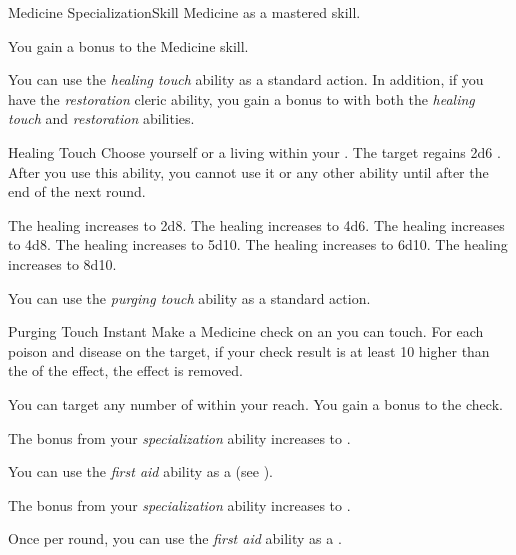     \begin{feat}{Medicine Specialization}{Skill}
        \featpre Medicine as a mastered skill.

         You gain a  bonus to the Medicine skill.

         You can use the \textit{healing touch} ability as a standard action.
        In addition, if you have the \textit{restoration} cleric ability, you gain a  bonus to  with both the \textit{healing touch} and \textit{restoration} abilities.
        \begin{instantability}{Healing Touch}
            \rankline
            Choose yourself or a living  within your .
            The target regains 2d6 \add {} .
            After you use this ability, you cannot use it or any other  ability until after the end of the next round.

            \rankline
             The healing increases to 2d8.
             The healing increases to 4d6.
             The healing increases to 4d8.
             The healing increases to 5d10.
             The healing increases to 6d10.
             The healing increases to 8d10.
        \end{instantability}

         You can use the \textit{purging touch} ability as a standard action.
        \begin{instantability}{Purging Touch}
            Instant
            \rankline
            Make a Medicine check on an  you can touch.
            For each poison and disease on the target, if your check result is at least 10 higher than the  of the effect, the effect is removed.

            \rankline
             You can target any number of  within your reach.
             You gain a  bonus to the check.
        \end{instantability}

         The bonus from your \textit{specialization} ability increases to .

         You can use the \textit{first aid} ability as a  (see ).

         The bonus from your \textit{specialization} ability increases to .

         Once per round, you can use the \textit{first aid} ability as a .
    \end{feat}

